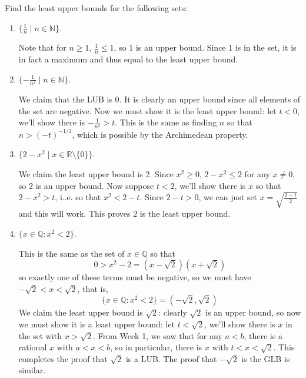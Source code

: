 \documentclass[11pt,dvipsnames]{book}
\def\R{\mathbb{R}}
\numberwithin{figure}{section} %
\numberwithin{table}{section} %
\begin{document}
\begin{exercise}
Find the least upper bounds for the following sets:
\begin{enumerate}[label=(\alph*)]
\item $\{\frac{1}{n} \; | \; n\in \mathbb{N}\}$.
\begin{solution}
Note that for $n\geq 1$, $\frac{1}{n}\leq 1$, so $1$ is an upper bound. Since $1$ is in the set, it is in fact a maximum and thus equal to the least upper bound.
\end{solution}
\item $\{-\frac{1}{n^2} \; | \; n\in\mathbb{N}\}$.
\begin{solution}
We claim that the LUB is $0$. It is clearly an upper bound since all elements of the set are negative. Now we must show it is the least upper bound: let $t<0$, we'll show there is $-\frac{1}{n^2}>t$. This is the same as finding $n$ so that $n>(-t)^{-1/2}$, which is possible by the Archimedean property.
\end{solution}
\item $\{2-x^2 \; | \; x\in \R\setminus\{0\}\}$.
\begin{solution}
We claim the least upper bound is 2. Since $x^2\geq 0$, $2-x^2\leq 2$ for any $x\neq 0$, so $2$ is an upper bound. Now suppose $t<2$, we'll show there is $x$ so that $2-x^2>t$, i..e. so that $x^2<2-t$. Since $2-t>0$, we can just set $x=\sqrt{\frac{2-t}{2}}$ and this will work. This proves $2$ is the least upper bound.
\end{solution}
\item $\{x\in\mathbb{Q}: x^2<2\}$.
\begin{solution}
This is the same  as the set of $x\in\mathbb{Q}$ so that
\[
0>x^2-2=(x-\sqrt{2})(x+\sqrt{2})
\]
so exactly one of these terms must be negative, so we must have $-\sqrt{2}<x<\sqrt{2}$, that is,
\[
\{x\in\mathbb{Q}: x^2<2\}=(-\sqrt{2},\sqrt{2})
\]
We claim the least upper bound is $\sqrt{2}$: clearly $\sqrt{2}$ is an upper bound, so now we must show it is a least upper bound: let $t<\sqrt{2}$, we'll show there is $x$ in the set with $x>\sqrt{2}$. From Week 1, we saw that for any $a<b$, there is a rational $x$ with $a<x<b$, so in particular, there is $x$ with $t<x<\sqrt{2}$. This completes the proof that $\sqrt{2}$ is a LUB. The proof that $-\sqrt{2}$ is the GLB is similar.
\end{solution}
\end{enumerate}

\end{exercise}
\end{document}
